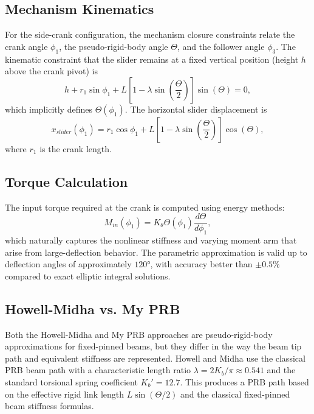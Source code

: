 \documentclass[colorlinks,upint,subscriptcorrection,varvw,hyphenate]{asmeconf}
\begin{document}
\subsection{Mechanism Kinematics}
For the side-crank configuration, the mechanism closure constraints relate the crank angle $\phi_1$, the pseudo-rigid-body angle $\Theta$, and the follower angle $\phi_3$. The kinematic constraint that the slider remains at a fixed vertical position (height $h$ above the crank pivot) is
\begin{equation}
    h + r_1\sin\phi_1 + L\left[1 - \lambda\sin\left(\frac{\Theta}{2}\right)\right]\sin(\Theta) = 0,
\end{equation}
which implicitly defines $\Theta(\phi_1)$. The horizontal slider displacement is
\begin{equation}
    x_{slider}(\phi_1) = r_1\cos\phi_1 + L\left[1 - \lambda\sin\left(\frac{\Theta}{2}\right)\right]\cos(\Theta),
\end{equation}
where $r_1$ is the crank length.

\subsection{Torque Calculation}
The input torque required at the crank is computed using energy methods:
\begin{equation}
    M_{in}(\phi_1) = K_\theta \Theta(\phi_1) \frac{d\Theta}{d\phi_1},
\end{equation}
which naturally captures the nonlinear stiffness and varying moment arm that arise from large-deflection behavior. The parametric approximation is valid up to deflection angles of approximately $120°$, with accuracy better than $\pm 0.5\%$ compared to exact elliptic integral solutions.

\subsection{Howell-Midha vs. My PRB}
Both the Howell-Midha and My PRB approaches are pseudo-rigid-body approximations for fixed-pinned beams, but they differ in the way the beam tip path and equivalent stiffness are represented. Howell and Midha use the classical PRB beam path with a characteristic length ratio $\lambda = 2K_b/\pi \approx 0.541$ and the standard torsional spring coefficient $K_b' = 12.7$. This produces a PRB path based on the effective rigid link length $L\sin(\Theta/2)$ and the classical fixed-pinned beam stiffness formulas.
\end{document}
